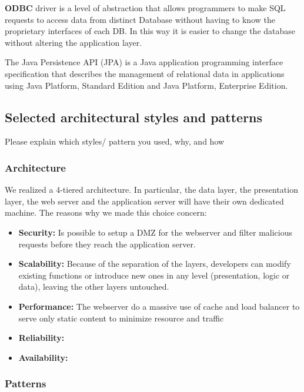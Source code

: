 \textbf{ODBC} driver is a level of abstraction that allows programmers to make SQL requests to access data from distinct Database without having to know the proprietary interfaces of each DB. In this way it is easier to change the database without altering the application layer.


The Java Persistence API (JPA) is a Java application programming interface specification that describes the management of relational data in applications using Java Platform, Standard Edition and Java Platform, Enterprise Edition.



\subsection{Selected architectural styles and patterns}
Please explain which styles/ pattern you used, why, and how
\subsubsection{Architecture}

We realized a 4-tiered architecture. In particular, the data layer, the presentation layer, the web server and the application server will have their own dedicated machine. The reasons why we made this choice concern:

\begin{itemize}
\item {\textbf{Security:}} Is possible to setup a DMZ for the webserver and filter malicious requests before they reach the application server.
\item {\textbf{Scalability:}} Because of the separation of the layers, developers can modify existing functions or introduce new ones in any level (presentation, logic or data), leaving the other layers untouched.
\item {\textbf{Performance:} The webserver do a massive use of cache and load balancer to serve only static content to minimize resource and traffic}
\item {\textbf{Reliability:}} 
\item {\textbf{Availability:}}
\end{itemize}


\subsubsection{Patterns}

